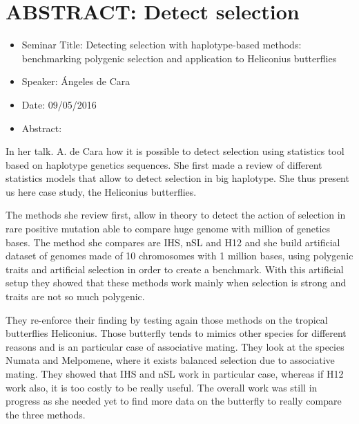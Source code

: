 \documentclass[10pt,letterpaper]{article}
\begin{document}
\section{ABSTRACT: Detect selection}
\begin{itemize}
    \item Seminar Title: Detecting selection with haplotype-based methods: benchmarking polygenic selection and application to Heliconius butterflies
    \item Speaker: Ángeles de Cara
    \item Date: 09/05/2016
    \item Abstract:
\end{itemize}
 
In her talk. A. de Cara how it is possible to detect selection using statistics tool based on haplotype genetics sequences. She first made a review of different statistics models that allow to detect selection in big haplotype.  She thus present us here case study, the Heliconius butterflies. 

The methods she review first, allow in theory to detect the action of selection in rare positive mutation able to compare huge genome with million of genetics bases.  The method she compares are IHS, nSL and H12 and she build artificial dataset of genomes made of 10 chromosomes with 1 million bases, using polygenic traits and artificial selection in order to create a benchmark. With this artificial setup they showed that these methods work mainly when selection is strong and traits are not so much polygenic. 

They re-enforce their finding by testing again those methods on the tropical butterflies Heliconius. Those butterfly tends to mimics other species for different reasons and is an particular case of associative mating. They look at the species Numata and Melpomene, where it exists balanced selection due to associative mating. They showed that IHS and nSL work in particular case, whereas if H12 work also, it is too costly to be really useful. The overall work was still in progress as she needed yet to find more data on the butterfly to really compare the three methods.


%
%
\end{document}
